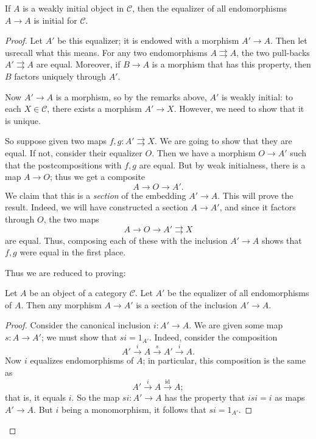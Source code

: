 \begin{proposition} \label{weakinitial}
If  $A$ is a weakly initial object in $\mathcal{C}$,
then the equalizer of all endomorphisms $A \to A$ is initial for $\mathcal{C}$.
\end{proposition}
\begin{proof}
Let $A'$ be this equalizer; it is endowed with a morphism $A'\to A$. Then let
usrecall what this means. For any two
endomorphisms $A \rightrightarrows A$, the two pull-backs $A'
\rightrightarrows A$ are equal. Moreover, if $B \to A$ is a morphism that has
this property, then $B$ factors uniquely through $A'$.

Now $A' \to A$ is a morphism, so by the remarks above, $A'$ is weakly initial:
to each $X \in \mathcal{C}$, there exists a morphism $A' \to X$.
However, we need to show that it is unique.

So suppose given two maps $f,g: A' \rightrightarrows X$. We are going to show
that they are equal. If not, consider their equalizer $O$.
Then we have a morphism $O \to A'$ such that the postcompositions with $f,g$
are equal. But by weak initialness, there is a map $A \to O$; thus we get a
composite
\[ A \to O \to A'.  \]
We claim that this is a \emph{section} of the embedding $A'\to A$.
This will prove the result. Indeed, we will have constructed a section $A \to
A'$, and since it factors through $O$, the two maps
\[ A \to O \to A' \rightrightarrows X  \]
are equal. Thus, composing each of these with the inclusion $A' \to A$ shows
that $f,g$ were equal in the first place.

Thus we are reduced to proving:
\begin{lemma}
Let $A$ be an object of a category $\mathcal{C}$. Let $A'$ be the equalizer of
all endomorphisms of $A$. Then any morphism $A \to A'$ is a section of the
inclusion $A' \to A$.
\end{lemma}
\begin{proof}
Consider the canonical inclusion $i: A' \to A$. We are given some map $s: A
\to A'$; we must show that $si = 1_{A'}$.
Indeed, consider the composition
\[ A' \stackrel{i}{\to} A \stackrel{s}{\to} A' \stackrel{i}{\to} A .\]
Now $i$ equalizes endomorphisms of $A$; in particular, this composition is the
same as
\[ A' \stackrel{i}{\to} A \stackrel{\mathrm{id}}{\to} A; \]
that is, it equals $i$. So the map $si: A' \to A$ has the property that $isi =
i$ as maps $A' \to A$. But $i$ being a monomorphism, it follows that $si  =
1_{A'}$.
\end{proof}
\end{proof}

